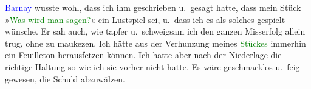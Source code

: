 \pstart
           \textcolor{blue}{Barnay}\ledrightnote{\textcolor{blue}{Ludwig Barnay}} wusste wohl, dass ich ihm geschrieben
               u. gesagt hatte, dass mein Stück »\textcolor{green}{Was wird man
                  sagen?}\ledrightnote{\textcolor{green}{Was wird man sagen?}}« ein Lustspiel sei, u. dass ich es als solches gespielt wünsche. Er
               sah auch, wie tapfer u. schweigsam ich den ganzen Misserfolg allein trug, ohne zu
               maukezen. Ich hätte aus der Verhunzung meines \textcolor{green}{Stückes}\ledrightnote{\textcolor{green}{Was wird man sagen?}} immerhin ein Feuilleton herausfetzen können. Ich hatte aber nach der
               Niederlage die richtige Haltung {\pb} so wie ich sie vorher nicht hatte. Es wäre
               geschmacklos u. feig gewesen, die Schuld abzuwälzen. \pend
           
